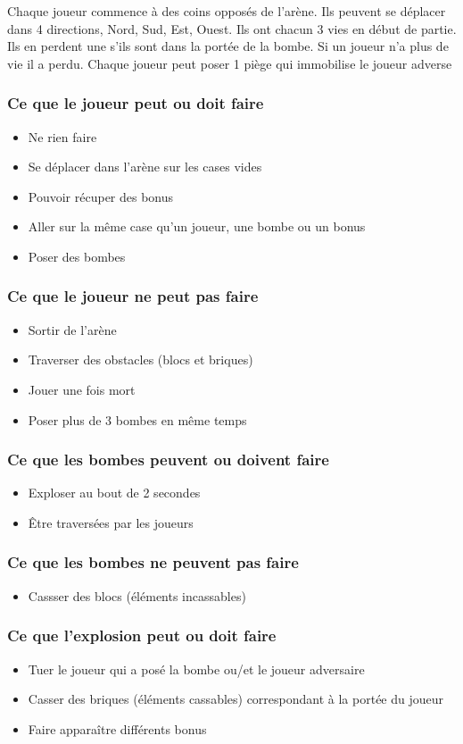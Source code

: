 \documentclass[a4paper,11pt,french]{article}
\begin{document}
Chaque joueur commence à des coins opposés de l'arène. Ils peuvent se déplacer dans 4 directions, Nord, Sud, Est, Ouest. 	Ils ont chacun 3 vies en début de partie. Ils en perdent une s'ils sont dans la portée de la bombe. Si un joueur n'a plus de vie il a perdu. Chaque joueur peut poser 1 piège qui immobilise le joueur adverse
\subsubsection{Ce que le joueur peut ou doit faire}
\begin{itemize}
\item Ne rien faire
\item Se déplacer dans l'arène sur les cases vides
\item Pouvoir récuper des bonus
\item Aller sur la même case qu'un joueur, une bombe ou un bonus
\item Poser des bombes
\end{itemize}
\subsubsection{Ce que le joueur ne peut pas faire}
\begin{itemize}
\item Sortir de l'arène
\item Traverser des obstacles (blocs et briques)
\item Jouer une fois mort
\item Poser plus de 3 bombes en même temps
\end{itemize}
\subsubsection{Ce que les bombes peuvent ou doivent faire}
\begin{itemize}
\item Exploser au bout de 2 secondes
\item Être traversées par les joueurs
\end{itemize}
\subsubsection{Ce que les bombes ne peuvent pas faire}
\begin{itemize}
\item Cassser des blocs (éléments incassables)
\end{itemize}
\subsubsection{Ce que l'explosion peut ou doit faire}
\begin{itemize}
\item Tuer le joueur qui a posé la bombe ou/et le joueur adversaire
\item Casser des briques (éléments cassables) correspondant à la portée du joueur
\item Faire apparaître différents bonus
\end{itemize}
\end{document}

